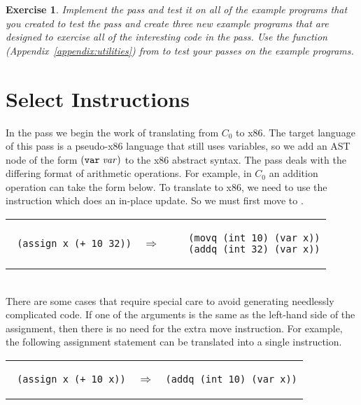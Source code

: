 \documentclass[11pt]{book}
\newtheorem{exercise}[theorem]{Exercise}
\begin{document}
\begin{exercise}
\normalfont
Implement the  pass and test it on all of the example
programs that you created to test the  pass and create
three new example programs that are designed to exercise all of the
interesting code in the  pass. Use the 
function (Appendix~\ref{appendix:utilities}) from  to
test your passes on the example programs.
\end{exercise}


\section{Select Instructions}
\label{sec:select-s0}

In the  pass we begin the work of translating
from $C_0$ to x86. The target language of this pass is a pseudo-x86
language that still uses variables, so we add an AST node of the form
$(\texttt{var}\;\mathit{var})$ to the x86 abstract syntax.  The
 pass deals with the differing format of
arithmetic operations. For example, in $C_0$ an addition operation can
take the form below.  To translate to x86, we need to use the
 instruction which does an in-place update. So we must first
move  to . \\
\begin{tabular}{lll}
\begin{minipage}{0.4\textwidth}
\begin{lstlisting}
 (assign x (+ 10 32))
\end{lstlisting}
\end{minipage}
&
$\Rightarrow$
&
\begin{minipage}{0.4\textwidth}
\begin{lstlisting}
   (movq (int 10) (var x))
   (addq (int 32) (var x))
\end{lstlisting}
\end{minipage}
\end{tabular} \\

There are some cases that require special care to avoid generating
needlessly complicated code. If one of the arguments is the same as
the left-hand side of the assignment, then there is no need for the
extra move instruction.  For example, the following assignment
statement can be translated into a single  instruction.\\
\begin{tabular}{lll}
\begin{minipage}{0.4\textwidth}
\begin{lstlisting}
 (assign x (+ 10 x))
\end{lstlisting}
\end{minipage}
&
$\Rightarrow$
&
\begin{minipage}{0.4\textwidth}
\begin{lstlisting}
(addq (int 10) (var x))
\end{lstlisting}
\end{minipage}
\end{tabular} \\
\end{document}
